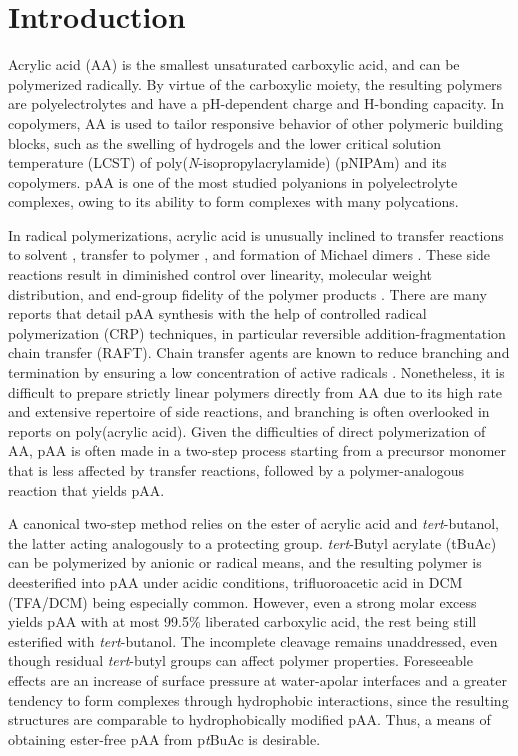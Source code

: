 \documentclass{article}
\begin{document}
\section*{Introduction}
Acrylic acid (AA) is the smallest unsaturated carboxylic acid, and can be polymerized radically. By virtue of the 
carboxylic moiety, the resulting polymers are polyelectrolytes and have a pH-dependent charge and H-bonding capacity. 
In copolymers, AA is used to tailor responsive behavior of other polymeric building blocks, 
such as the swelling of hydrogels \cite{Lue2011, Yoo2000} and the lower critical solution temperature (LCST) 
of poly(\emph{N}-isopropylacrylamide) (pNIPAm) and its copolymers. \cite{Bokias2000} pAA is one of the most studied
polyanions in polyelectrolyte complexes, owing to its ability to form complexes with many polycations. 
\cite{Blocher2017, Liu2017}

In radical polymerizations, acrylic acid is unusually inclined to transfer reactions to solvent \cite{Loiseau2003a}, 
transfer to polymer \cite{Lena2017}, and formation of Michael dimers \cite{LLauro2004}. These side reactions result in diminished control 
over linearity, molecular weight distribution, and end-group fidelity of the polymer products \cite{Maniego2013, LLauro2004}. There are many
reports that detail pAA synthesis with the help of controlled radical polymerization (CRP) techniques, in particular reversible addition-fragmentation 
chain transfer \cite{Pelet2012, Loiseau2003a, Chaduc2013} (RAFT). Chain transfer agents are known to reduce branching and termination by ensuring 
a low concentration of active radicals \cite{Lena2017}. Nonetheless, it is difficult to prepare strictly linear polymers directly from AA
due to its high rate and extensive repertoire of side reactions, and branching is often overlooked in reports on poly(acrylic acid). \cite{Loiseau2003a, LLauro2004} 
Given the difficulties of direct polymerization of AA, pAA is often made in a two-step process starting from a precursor monomer that is less affected 
by transfer reactions, followed by a polymer-analogous reaction that yields pAA. 

A canonical two-step method relies on the ester of acrylic acid and \emph{tert}-butanol, the latter acting analogously to a protecting group. 
\emph{tert}-Butyl acrylate ({t}BuAc) can be polymerized by anionic or radical means, and the resulting polymer is deesterified into pAA under acidic conditions,
trifluoroacetic acid in DCM (TFA/DCM) being especially common. \cite{Dulong2015, Yong2016, Chen2013a, Li2006, Li2008a, Lauber2017} 
However, even a strong molar excess yields pAA with at most 99.5\% liberated 
carboxylic acid, the rest being still esterified with 
\emph{tert}-butanol.\cite{Loiseau2003a, Chen2013a}  The 
incomplete cleavage remains unaddressed, even though residual \emph{tert}-butyl groups 
can affect polymer properties. Foreseeable effects are an increase of surface pressure at water-apolar interfaces and a greater tendency to 
form complexes through hydrophobic interactions, since the resulting structures are comparable to hydrophobically modified pAA. Thus, a means 
of obtaining ester-free pAA from p\emph{t}BuAc is desirable.
\end{document}
